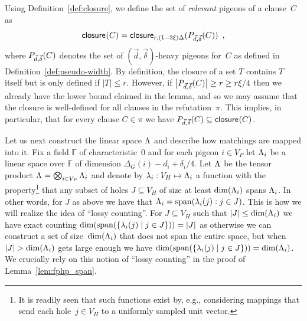 \documentclass{article}
\newcommand{\set}[1]{\{ #1 \}}
\newcommand{\setdescr}[3][\mid]{\set{ #2 #1 #3 }}
\newcommand{\Setsize}[1]{\bigl\lvert#1\bigr\rvert}
\newcommand{\setsize}[1]{\lvert#1\rvert}
\newcommand{\introduceterm}[1]{{\emph{#1}}}
\newcommand{\eqcomma}{\enspace ,}
\newcommand{\reflem}[1]{Lemma~\ref{#1}}
\newcommand{\refdef}[1]{Definition~\ref{#1}}
\newcommand{\refpi}{\pi}
\newcommand{\heavy}{heavy\xspace}
\renewcommand{\deg}[2][XXXXXXXXXXXX]{\Delta_{#1}(#2)}
\newcommand{\diff}{\xi}
\newcommand{\dimLi}{\deg[G]{i} - d_i + \delta_i/4}
\newcommand{\GdegMax}{\Delta}
\newcommand{\gdegmax}{\GdegMax}
\newcommand{\V}[1][]{V_{#1}}
\newcommand{\Vp}{\V[P]}
\newcommand{\Vh}{\V[H]}
\newcommand{\vecthr}{\vec{d}}
\newcommand{\vecadv}{\vec{\delta}}
\newcommand{\Pthick}[1]{\ensuremath P_{\vecthr,\vecadv}(#1)}
\newcommand{\linspace}[1][]{\ensuremath \Lambda_{{#1}}}
\newcommand{\linmap}[1][]{\ensuremath \lambda_{{#1}}}
\newcommand{\linmapof}[2][]{\linmap[#1](#2)}
\newcommand{\closure}[2][]{\mathsf{closure}_{{#1}}(#2)}
\newcommand{\spans}[1]{\mathrm{span} ( #1 )}
\newcommand{\bigtensor}{\ensuremath \bigotimes}
\numberwithin{equation}{section}
\begin{document}
\lemmafphplower*

Using \refdef{def:closure}, we define the set of
\introduceterm{relevant} pigeons of a clause~$C$ as
\begin{equation}
  \closure{C} = \closure[r, (1 - 3\diff)\gdegmax]{\Pthick{C}} 
  \eqcomma
\end{equation}
where 
$\Pthick{C} $
denotes the set of
$(\vecthr, \vecadv)$-\heavy pigeons for~$C$ as defined in
\refdef{def:pseudo-width}.
By definition,
the closure of a set $T$ contains $T$ itself 
but is only defined if $\setsize{T} \le r$.
However, if $ \Setsize{\Pthick{C}} \geq r \geq r \diff/4 $ then we
already have the lower bound claimed in the lemma, and so we may
assume that the closure is well-defined for all clauses in the
refutation~$\refpi$.  This implies, in particular, that for every
clause $C \in \refpi$ we have $\Pthick{C} \subseteq \closure{C}$.

Let us next construct the linear space $\linspace$ and describe how
matchings are mapped into it.  Fix a field $\mathbb{F}$ of characteristic~$0$ and for each pigeon
$i \in \Vp$ let $\linspace[i]$ be a linear space over $\mathbb{F}$ of
dimension $\dimLi$. Let $\linspace$ be the tensor product
$\linspace = \bigtensor_{i \in \Vp} \linspace[i]$ and denote by
$\linmap[i]: \Vh \mapsto \linspace[i]$ a function with the
property\footnote{It is readily seen that such functions exist by,
  e.g., considering mappings that send each hole~$j \in \Vh$ to a
  uniformly sampled unit vector.} that any subset of holes
$J \subseteq \Vh$ of size at least $\dim(\linspace[i])$ spans
$\linspace[i]$. In other words, for $J$ as above
we have that $\linspace[i] = \spans{\linmapof[i]{j}:j\in J}$.
This is how we will realize the idea of ``lossy counting''. For
$J \subseteq \Vh$ such that $\setsize{J} \le \dim(\linspace[i])$ we
have exact counting
$ \dim(\spans{\setdescr{\linmap[i](j)}{j \in J}}) = \setsize{J} $ as
otherwise we can construct a set of size~$\dim(\linspace[i])$ that
does not span the entire space, but
when $ \setsize{J} > \dim(\linspace[i]) $ gets large enough we have
$ \dim(\spans{\setdescr{\linmap[i](j)}{j \in J}}) = \dim(\linspace[i])
$. We crucially rely on this notion of ``lossy counting'' in the proof
of \reflem{lem:fphp_span}.
\end{document}

